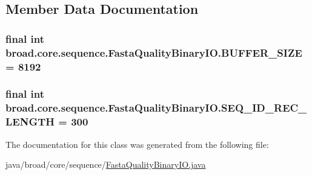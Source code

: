 \subsection{Member Data Documentation}
\hypertarget{classbroad_1_1core_1_1sequence_1_1_fasta_quality_binary_i_o_af92ef4c8281e95df9d7ecb8cfd0c0662}{
\subsubsection[{B\+U\+F\+F\+E\+R\+\_\+\+S\+I\+Z\+E}]{\setlength{\rightskip}{0pt plus 5cm}final int broad.\+core.\+sequence.\+Fasta\+Quality\+Binary\+I\+O.\+B\+U\+F\+F\+E\+R\+\_\+\+S\+I\+Z\+E = 8192\hspace{0.3cm}{\ttfamily [static]}}}\label{classbroad_1_1core_1_1sequence_1_1_fasta_quality_binary_i_o_af92ef4c8281e95df9d7ecb8cfd0c0662}
\hypertarget{classbroad_1_1core_1_1sequence_1_1_fasta_quality_binary_i_o_a3c8ecdb5a93f86f2a1cff925a3603660}{
\subsubsection[{S\+E\+Q\+\_\+\+I\+D\+\_\+\+R\+E\+C\+\_\+\+L\+E\+N\+G\+T\+H}]{\setlength{\rightskip}{0pt plus 5cm}final int broad.\+core.\+sequence.\+Fasta\+Quality\+Binary\+I\+O.\+S\+E\+Q\+\_\+\+I\+D\+\_\+\+R\+E\+C\+\_\+\+L\+E\+N\+G\+T\+H = 300\hspace{0.3cm}{\ttfamily [static]}}}\label{classbroad_1_1core_1_1sequence_1_1_fasta_quality_binary_i_o_a3c8ecdb5a93f86f2a1cff925a3603660}


The documentation for this class was generated from the following file\+:\begin{DoxyCompactItemize}
\item 
java/broad/core/sequence/\hyperlink{_fasta_quality_binary_i_o_8java}{Fasta\+Quality\+Binary\+I\+O.\+java}\end{DoxyCompactItemize}
